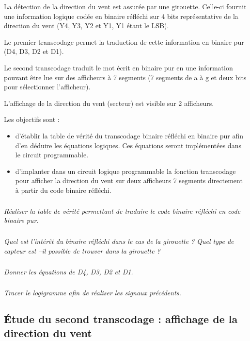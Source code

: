 \documentclass[10pt]{article}
\begin{document}
La détection de la direction du vent est assurée par une girouette. Celle-ci fournit une information logique codée en binaire réfléchi sur 4 bits représentative de la direction du vent (Y4, Y3, Y2 et Y1, Y1 étant le LSB).

Le premier transcodage permet la traduction de cette information en binaire pur (D4, D3, D2 et D1).

Le second transcodage traduit le mot écrit en binaire pur en une information pouvant être lue sur des afficheurs à 7 segments (7 segments de a à g et deux bits pour sélectionner l’afficheur).

L'affichage de la direction du vent (secteur) est visible sur 2 afficheurs. 

\begin{obj}

Les objectifs sont :
\begin{itemize}
\item d'établir la table de vérité du transcodage binaire réfléchi en binaire pur afin d’en déduire les équations logiques. Ces équations seront implémentées dans le circuit programmable.
\item d’implanter dans un circuit logique programmable la fonction transcodage pour afficher la direction du vent sur deux afficheurs 7 segments directement à partir du code binaire réfléchi.
\end{itemize}

\end{obj}

\subparagraph{}
\textit{Réaliser la table de vérité permettant de traduire le code binaire réfléchi en code binaire pur.}

\subparagraph{}
\textit{Quel est l’intérêt du binaire réfléchi dans le cas de la girouette ? Quel type de capteur est –il possible de trouver dans la girouette ?}

\subparagraph{}
\textit{Donner les équations de D4, D3, D2 et D1.}

\subparagraph{}
\textit{Tracer le logigramme afin de réaliser les signaux précédents. }


\subsection{Étude du second transcodage : affichage de la direction du vent}
\end{document}
